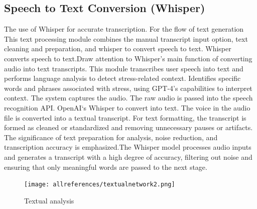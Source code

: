 \documentclass[Arial,12pt,openright,twoside]{book}
\begin{document}
\subsection{Speech to Text Conversion (Whisper)}
\noindent
\begin{minipage}{\textwidth}
The use of Whisper\cite{machaek2023} for accurate transcription. For the flow of text generation This text processing module combines the manual transcript input option, text cleaning and preparation, and whisper to convert speech to text. Whisper converts speech to text.Draw attention to Whisper's main function of converting audio into text transcripts.  This module transcribes user speech into text and performs language analysis to detect stress-related context. Identifies specific words and phrases associated with stress, using GPT-4's capabilities to interpret context. The system captures the audio. The raw audio is passed into the speech recognition API. OpenAI‘s Whisper to convert into text. The voice in the audio file is converted into a textual transcript. For text formatting, the transcript is formed as cleaned or standardized and removing unnecessary pauses or artifacts. 
 The significance of text preparation for analysis, noise reduction, and transcription accuracy is emphasized.The Whisper model processes audio inputs and generates a transcript with a high degree of accuracy, filtering out noise and ensuring that only meaningful words are passed to the next stage.
\vspace{10pt} %
\FloatBarrier
\begin{figure}[H]
\centering
\texttt{[image: allreferences/textualnetwork2.png]}
\caption{Textual analysis}
\label{fig:system_architecture}
\end{figure}
\end{minipage}
\vspace{10pt} %
\end{document}
